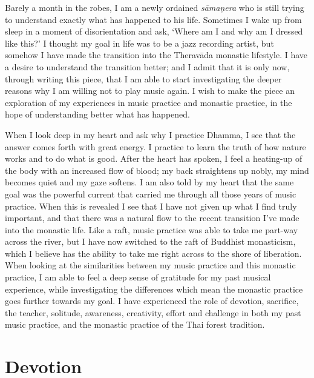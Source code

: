 
Barely a month in the robes, I am a newly ordained \emph{sāmaṇera} who
is still trying to understand exactly what has happened to his life. 
Sometimes I wake up from sleep in a moment of disorientation and ask, 
`Where am I and why am I dressed like this?' I thought my goal in life
was to be a jazz recording artist, but somehow I have made the
transition into the Theravāda  monastic lifestyle. I have a desire to
understand the transition better; and I admit that it is only now, 
through writing this piece, that I am able to start investigating the
deeper reasons why I am willing not to play music again. I wish to make
the piece an exploration of my experiences in music practice and
monastic practice, in the hope of understanding better what has
happened. 

When I look deep in my heart and ask why I practice Dhamma, I see that
the answer comes forth with great energy. I practice to learn the truth
of how nature works and to do what is good. After the heart has spoken, 
I feel a heating-up of the body with an increased flow of blood; my back
straightens up nobly, my mind becomes quiet and my gaze softens. I am
also told by my heart that the same goal was the powerful current that
carried me through all those years of music practice. When this is
revealed I see that I have not given up what I find truly important, and
that there was a natural flow to the recent transition I've made into
the monastic life. Like a raft, music practice was able to take me
part-way across the river, but I have now switched to the raft of
Buddhist monasticism, which I believe has the ability to take me right
across to the shore of liberation. When looking at the similarities
between my music practice and this monastic practice, I am able to feel
a deep sense of gratitude for my past musical experience, while
investigating the differences which mean the monastic practice goes
further towards my goal. I have experienced the role of devotion, 
sacrifice, the teacher, solitude, awareness, creativity, effort and
challenge in both my past music practice, and the monastic practice of
the Thai forest tradition. 

\section{Devotion}


